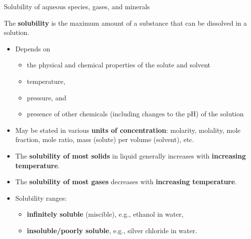 %
\begin{frame}{Solubility of aqueous species, gases, and minerals}

The \alert{\textbf{solubility}} is the maximum amount of a substance that can be dissolved in a solution. 

\begin{itemize}
\item Depends on 
\begin{itemize}
\item the {physical and chemical properties of the solute and solvent} 
\item temperature, 
\item pressure, and 
\item presence of other chemicals (including changes to the pH) of the solution
\end{itemize}
%
\item May be stated in various \textbf{units of concentration}: molarity, molality, mole fraction, mole ratio, mass (solute) per volume (solvent), etc.

\item The \textbf{solubility of most solids} in liquid generally increases with \textbf{increasing temperature}.

\item The \textbf{solubility of most gases} decreases with \textbf{increasing temperature}. 

\item Solubility ranges:
%
\begin{itemize}
\item \textbf{infinitely soluble} (miscible), e.g., ethanol in water,
\item \textbf{insoluble/poorly soluble}, e.g., silver chloride in water.
\end{itemize}


\end{itemize}

\end{frame}
